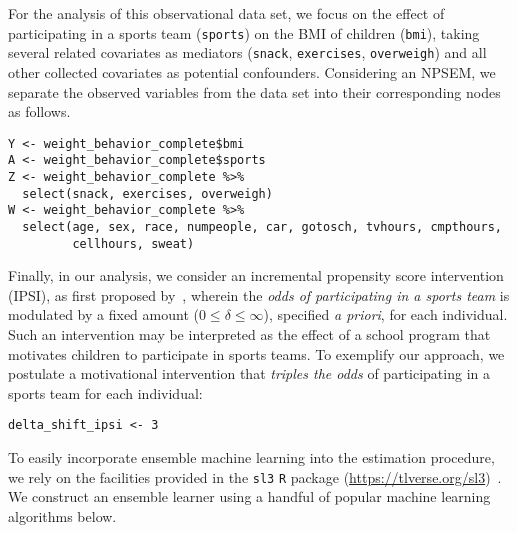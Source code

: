 For the analysis of this observational data set, we focus on the effect of
participating in a sports team (\texttt{sports}) on the BMI of children
(\texttt{bmi}), taking several related covariates as mediators (\texttt{snack},
\texttt{exercises}, \texttt{overweigh}) and all other collected covariates as
potential confounders. Considering an NPSEM, we separate the observed variables
from the data set into their corresponding nodes as follows.

\begin{lstlisting}
Y <- weight_behavior_complete$bmi
A <- weight_behavior_complete$sports
Z <- weight_behavior_complete %>%
  select(snack, exercises, overweigh)
W <- weight_behavior_complete %>%
  select(age, sex, race, numpeople, car, gotosch, tvhours, cmpthours,
         cellhours, sweat)
\end{lstlisting}

Finally, in our analysis, we consider an incremental propensity score
intervention (IPSI), as first proposed by~\citet{kennedy2017nonparametric},
wherein the \textit{odds of participating in a sports team} is modulated by
a fixed amount ($0 \leq \delta \leq \infty$), specified \textit{a priori}, for
each individual. Such an intervention may be interpreted as the effect of
a school program that motivates children to participate in sports teams. To
exemplify our approach, we postulate a motivational intervention that
\textit{triples the odds} of participating in a sports team for each individual:
\begin{lstlisting}
delta_shift_ipsi <- 3
\end{lstlisting}

To easily incorporate ensemble machine learning into the estimation procedure,
we rely on the facilities provided in the \texttt{sl3} \texttt{R}
package (\url{https://tlverse.org/sl3})~\citep{coyle2021sl3}.
We construct an ensemble learner using a handful of popular machine learning
algorithms below.

